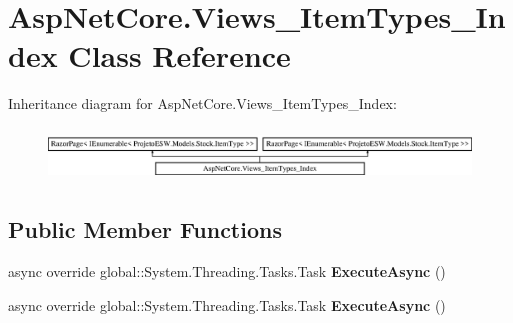 \hypertarget{class_asp_net_core_1_1_views___item_types___index}{}\section{Asp\+Net\+Core.\+Views\+\_\+\+Item\+Types\+\_\+\+Index Class Reference}
\label{class_asp_net_core_1_1_views___item_types___index}
Inheritance diagram for Asp\+Net\+Core.\+Views\+\_\+\+Item\+Types\+\_\+\+Index\+:\begin{figure}[H]
\begin{center}
\leavevmode
\includegraphics[height=1.414141cm]{class_asp_net_core_1_1_views___item_types___index}
\end{center}
\end{figure}
\subsection*{Public Member Functions}
\begin{DoxyCompactItemize}
\item 
\mbox{\label{class_asp_net_core_1_1_views___item_types___index_abb5c815ac16a8def62a5aad2a8ba2854}} 
async override global\+::\+System.\+Threading.\+Tasks.\+Task {\bfseries Execute\+Async} ()
\item 
\mbox{\label{class_asp_net_core_1_1_views___item_types___index_abb5c815ac16a8def62a5aad2a8ba2854}} 
async override global\+::\+System.\+Threading.\+Tasks.\+Task {\bfseries Execute\+Async} ()
\end{DoxyCompactItemize}
